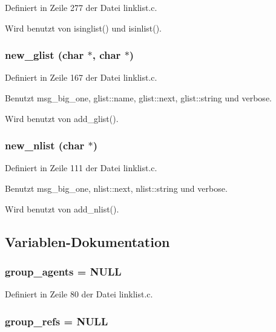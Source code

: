 Definiert in Zeile 277 der Datei linklist.c.

Wird benutzt von isinglist() und isinlist().
\subsubsection{ new\_\-glist (char $\ast$, char $\ast$)}\label{linklist_8c_efe1a363b71eccafc7f2c8e31f8f2b05}




Definiert in Zeile 167 der Datei linklist.c.

Benutzt msg\_\-big\_\-one, glist::name, glist::next, glist::string und verbose.

Wird benutzt von add\_\-glist().
\subsubsection{ new\_\-nlist (char $\ast$)}\label{linklist_8c_2818014b7feb4f6db3a0884d0c7caf0f}




Definiert in Zeile 111 der Datei linklist.c.

Benutzt msg\_\-big\_\-one, nlist::next, nlist::string und verbose.

Wird benutzt von add\_\-nlist().

\subsection{Variablen-Dokumentation}
\subsubsection{ {\bf group\_\-agents} = NULL}\label{linklist_8c_2acbebab9914d67a3cea0f3716324fe2}




Definiert in Zeile 80 der Datei linklist.c.
\subsubsection{ {\bf group\_\-refs} = NULL}\label{linklist_8c_73820e36830211218e9c911bc6ea6273}




